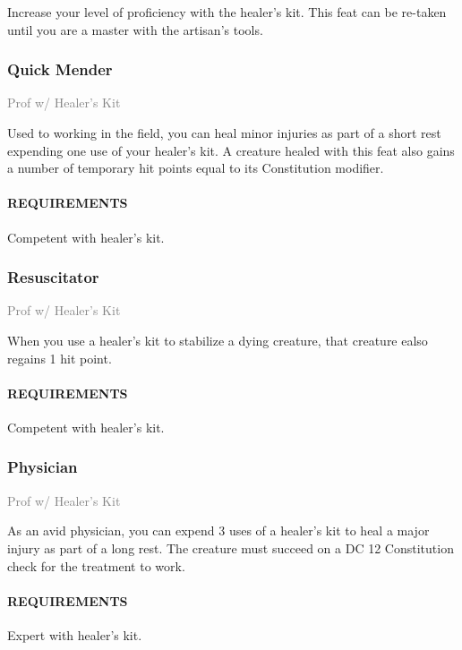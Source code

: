     \normalsize
    Increase your level of proficiency with the healer's kit.
    This feat can be re-taken until you are a master with the artisan's tools.

    \subsubsection{Quick Mender} \label{feat::quickmender}
    \small{\textcolor{gray}{Prof w/ Healer's Kit}}

    \normalsize
    Used to working in the field, you can heal minor injuries as part of a short rest expending one use of your healer's kit.
    A creature healed with this feat also gains a number of temporary hit points equal to its Constitution modifier.
    \paragraph{REQUIREMENTS} Competent with healer's kit.

    \subsubsection{Resuscitator} \label{feat::resuscitator}
    \small{\textcolor{gray}{Prof w/ Healer's Kit}}

    \normalsize
    When you use a healer's kit to stabilize a dying creature, that creature ealso regains 1 hit point.
    \paragraph{REQUIREMENTS} Competent with healer's kit.

    \subsubsection{Physician} \label{feat::physician}
    \small{\textcolor{gray}{Prof w/ Healer's Kit}}

    \normalsize
    As an avid physician, you can expend 3 uses of a healer's kit to heal a major injury as part of a long rest.
    The creature must succeed on a DC 12 Constitution check for the treatment to work.
    \paragraph{REQUIREMENTS} Expert with healer's kit.

